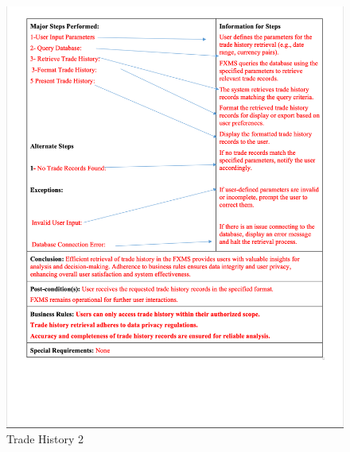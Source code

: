 \documentclass[a4paper]{report}
\begin{document}
\begin{figure}[h!]
    \centering
    \includegraphics[width=\textwidth]{images/uc/9.2-trade-history.png}
    \caption{Trade History 2}
    \label{fig:9.2-trade-history}
\end{figure}
\end{document}
